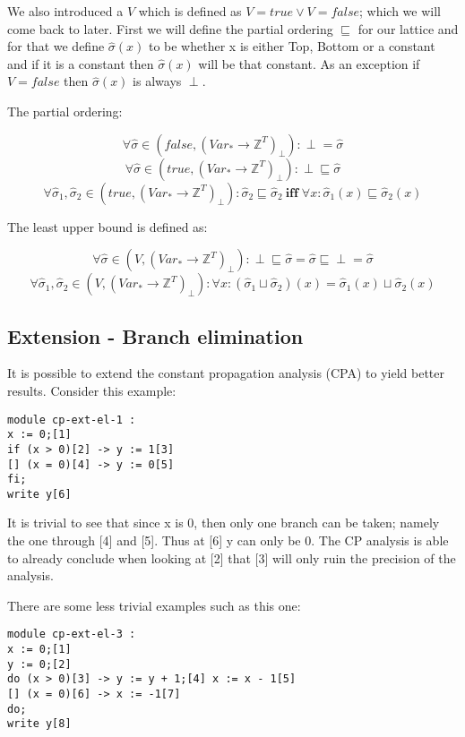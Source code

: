   We also introduced a $V$ which is defined as $V = true \vee V = false$; which
we will come back to later.  First we will define the partial ordering
$\sqsubseteq$ for our lattice and for that we define $\hat{\sigma}(x)$ to be
whether x is either Top, Bottom or a constant and if it is a constant then
$\hat{\sigma}(x)$ will be that constant. As an exception if $V = false$ then
$\hat{\sigma}(x)$ is always $\perp$.

\docpar
The partial ordering:

\[ \forall{}\hat{\sigma} \in (false, (Var_{*} \rightarrow \mathbb{Z}^{T})_{\perp}):
 \perp = \hat{\sigma} \]
\[ \forall{}\hat{\sigma} \in (true, (Var_{*} \rightarrow \mathbb{Z}^{T})_{\perp}):
 \perp \sqsubseteq \hat{\sigma} \]
\[ \forall{}\hat{\sigma}_1,\hat{\sigma}_2 \in (true, (Var_{*} \rightarrow
 \mathbb{Z}^{T})_\perp): \hat{\sigma}_2 \sqsubseteq \hat{\sigma}_2 \: \textbf{iff}
 \; \forall{}x : \hat{\sigma}_1(x) \sqsubseteq \hat{\sigma}_2(x) \]

\docpar
The least upper bound is defined as:

\[ \forall{}\hat{\sigma} \in (V, (Var_{*} \rightarrow \mathbb{Z}^{T})_{\perp}):
 \perp \sqsubseteq \hat{\sigma} = \hat{\sigma} \sqsubseteq \perp = \hat{\sigma} \]
\[ \forall{}\hat{\sigma}_1,\hat{\sigma}_2 \in (V, (Var_{*} \rightarrow
 \mathbb{Z}^{T})_\perp): \forall{}x : (\hat{\sigma}_1 \sqcup \hat{\sigma}_2)(x) =
 \hat{\sigma}_1(x) \sqcup \hat{\sigma}_2(x) \]


\subsection{Extension - Branch elimination}
It is possible to extend the constant propagation analysis (CPA) to yield better
results. Consider this example:

\begin{lstlisting}
module cp-ext-el-1 :
x := 0;[1]
if (x > 0)[2] -> y := 1[3]
[] (x = 0)[4] -> y := 0[5]
fi;
write y[6]
\end{lstlisting}

\docpar
It is trivial to see that since x is 0, then only one branch can be taken; namely
the one through [4] and [5]. Thus at [6] y can only be 0. The CP analysis is able
to already conclude when looking at [2] that [3] will only ruin the precision
of the analysis.

  There are some less trivial examples such as this one:

\begin{lstlisting}
module cp-ext-el-3 :
x := 0;[1]
y := 0;[2]
do (x > 0)[3] -> y := y + 1;[4] x := x - 1[5]
[] (x = 0)[6] -> x := -1[7]
do;
write y[8]
\end{lstlisting}

